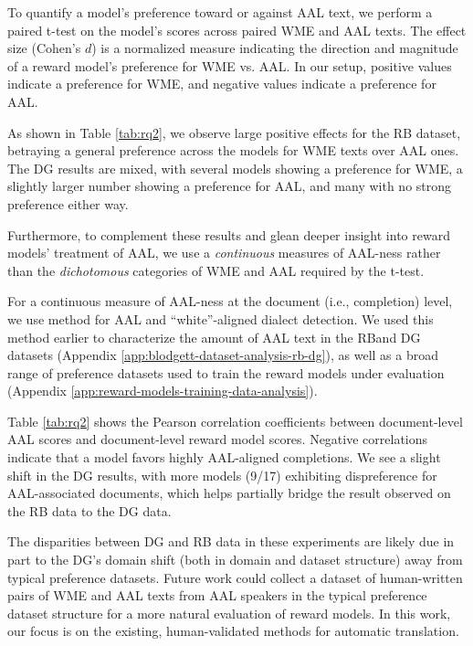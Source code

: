 To quantify a model’s preference toward or against AAL text, we perform a paired t-test on the model’s scores across paired WME and AAL texts. The effect size (Cohen's $d$) is a normalized measure indicating the direction and magnitude of a reward model's preference for WME vs. AAL. In our setup, positive values indicate a preference for WME, and negative values indicate a preference for AAL. 

As shown in Table \ref{tab:rq2}, we observe large positive effects for the RB dataset, betraying a general preference across the models for WME texts over AAL ones. The \textsc{DG} results are mixed, with several models showing a preference for WME, a slightly larger number showing a preference for AAL, and many with no strong preference either way.

Furthermore, to complement these results and glean deeper insight into reward models' treatment of AAL, we use a \textit{continuous} measures of AAL-ness rather than the \textit{dichotomous} categories of WME and AAL required by the t-test.

For a continuous measure of AAL-ness at the document (i.e., completion) level, we use  method for AAL and ``white''-aligned dialect detection. We used this method earlier to characterize the amount of AAL text in the \textsc{RB}and \textsc{DG} datasets (Appendix \ref{app:blodgett-dataset-analysis-rb-dg}), as well as a broad range of preference datasets used to train the reward models under evaluation (Appendix \ref{app:reward-models-training-data-analysis}).

Table \ref{tab:rq2} shows the Pearson correlation coefficients between document-level AAL scores and document-level reward model scores. Negative correlations indicate that a model favors highly AAL-aligned completions. We see a slight shift in the \textsc{DG} results, with more models (9/17) exhibiting dispreference for AAL-associated documents, which helps partially bridge the result observed on the \textsc{RB} data to the \textsc{DG} data. 

The disparities between \textsc{DG} and \textsc{RB} data in these experiments are likely due in part to the \textsc{DG}'s domain shift (both in domain and dataset structure) away from typical preference datasets. Future work could collect a dataset of human-written pairs of WME and AAL texts from AAL speakers in the typical preference dataset structure for a more natural evaluation of reward models. In this work, our focus is on the existing, human-validated methods for automatic translation.

